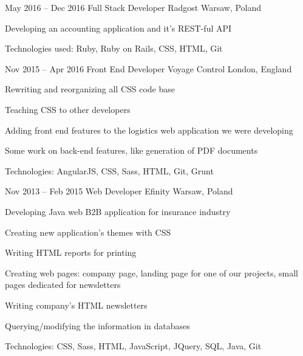 \begin{sectionlist}
    \sectionlistitemjob
        {May 2016 -- Dec 2016}
        {Full Stack Developer}
        {Radgost}
        {Warsaw, Poland}
        {
            \begin{joblisting}
                \item Developing an accounting application and it's REST-ful
                    API
                \item Technologies used: Ruby, Ruby on Rails, CSS, HTML, Git
            \end{joblisting}
        }

    \sectionlistitemjob
        {Nov 2015 -- Apr 2016}
        {Front End Developer}
        {Voyage Control}
        {London, England}
        {
            \begin{joblisting}
                \item Rewriting and reorganizing all CSS code base
                \item Teaching CSS to other developers
                \item Adding front end features to the logistics web
                    application we were developing
                \item Some work on back-end features, like generation of PDF
                    documents
                \item Technologies: AngularJS, CSS, Sass, HTML, Git, Grunt
            \end{joblisting}
        }

    \sectionlistitemjob
        {Nov 2013 -- Feb 2015}
        {Web Developer}
        {Efinity}
        {Warsaw, Poland}
        {
            \begin{joblisting}
                \item Developing Java web B2B application for insurance
                    industry
                \item Creating new application's themes with CSS
                \item Writing HTML reports for printing
                \item Creating web pages: company page, landing page for one 
                    of our projects, small pages dedicated for newsletters
                \item Writing company's HTML newsletters
                \item Querying/modifying the information in databases
                \item Technologies: CSS, Sass, HTML, JavaScript, JQuery,
                    SQL, Java, Git
            \end{joblisting}
        }

\end{sectionlist}
